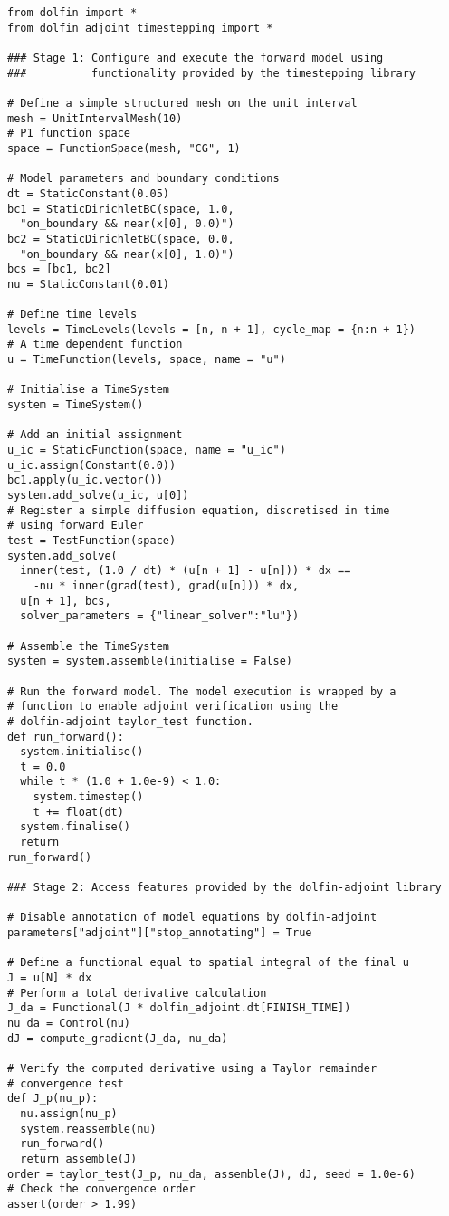 \documentclass[a4paper]{book}
\begin{document}
\begin{lstlisting}
from dolfin import *
from dolfin_adjoint_timestepping import *

### Stage 1: Configure and execute the forward model using
###          functionality provided by the timestepping library

# Define a simple structured mesh on the unit interval
mesh = UnitIntervalMesh(10)
# P1 function space
space = FunctionSpace(mesh, "CG", 1)

# Model parameters and boundary conditions
dt = StaticConstant(0.05)
bc1 = StaticDirichletBC(space, 1.0,
  "on_boundary && near(x[0], 0.0)")
bc2 = StaticDirichletBC(space, 0.0,
  "on_boundary && near(x[0], 1.0)")
bcs = [bc1, bc2]
nu = StaticConstant(0.01)

# Define time levels
levels = TimeLevels(levels = [n, n + 1], cycle_map = {n:n + 1})
# A time dependent function
u = TimeFunction(levels, space, name = "u")

# Initialise a TimeSystem
system = TimeSystem()

# Add an initial assignment
u_ic = StaticFunction(space, name = "u_ic")
u_ic.assign(Constant(0.0))
bc1.apply(u_ic.vector())
system.add_solve(u_ic, u[0])
# Register a simple diffusion equation, discretised in time
# using forward Euler
test = TestFunction(space)
system.add_solve(
  inner(test, (1.0 / dt) * (u[n + 1] - u[n])) * dx ==
    -nu * inner(grad(test), grad(u[n])) * dx,
  u[n + 1], bcs,
  solver_parameters = {"linear_solver":"lu"})

# Assemble the TimeSystem
system = system.assemble(initialise = False)

# Run the forward model. The model execution is wrapped by a
# function to enable adjoint verification using the
# dolfin-adjoint taylor_test function.
def run_forward():
  system.initialise()
  t = 0.0
  while t * (1.0 + 1.0e-9) < 1.0:
    system.timestep()
    t += float(dt)
  system.finalise()
  return
run_forward()

### Stage 2: Access features provided by the dolfin-adjoint library

# Disable annotation of model equations by dolfin-adjoint
parameters["adjoint"]["stop_annotating"] = True

# Define a functional equal to spatial integral of the final u
J = u[N] * dx
# Perform a total derivative calculation
J_da = Functional(J * dolfin_adjoint.dt[FINISH_TIME])
nu_da = Control(nu)
dJ = compute_gradient(J_da, nu_da)

# Verify the computed derivative using a Taylor remainder
# convergence test  
def J_p(nu_p):
  nu.assign(nu_p)
  system.reassemble(nu)
  run_forward()
  return assemble(J)
order = taylor_test(J_p, nu_da, assemble(J), dJ, seed = 1.0e-6)
# Check the convergence order
assert(order > 1.99)
\end{lstlisting}
\end{document}
